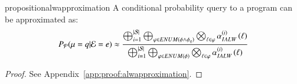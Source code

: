 \begin{restatable}{proposition}{alwapproximation}
\label{prop:alwapproximation}
A conditional probability query to a  \dcproblogsty program \dcpprogram can be approximated as: 
    \begin{align}
    P_\mathcal{P}(\mu=q|\mathcal{E}=e) 
    \approx    
    \frac
    { \bigoplus_{i=1}^{\lvert \mathcal{S} \rvert}  \bigoplus_{\varphi\in ENUM(\phi \land \phi_{q})} \bigotimes_{\ell \in \varphi}  \alpha_{IALW}^{(i)} \left(\ell \right)}
    { \bigoplus_{i=1}^{\lvert \mathcal{S} \rvert}  \bigoplus_{\varphi\in ENUM(\phi)} \bigotimes_{\ell \in \varphi}  \alpha_{IALW}^{(i)} \left(\ell \right)}  
    \label{eq:prop:alwapproximation}
    \end{align}
    
\end{restatable}

\begin{proof}
    See Appendix~\ref{app:proof:alwapproximation}.
\end{proof}




    







